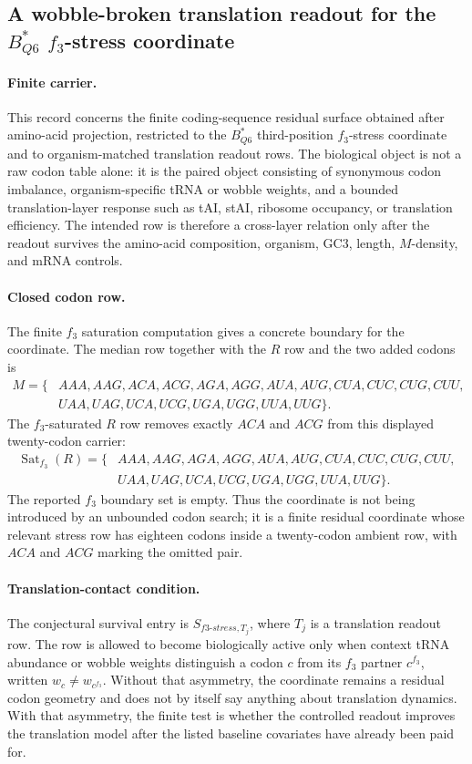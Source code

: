 \subsection{A wobble-broken translation readout for the $B^{*}_{Q6}$ $f_3$-stress coordinate}
\label{sec:q6-f3-stress-wobble-broken-translation-readout-cross-layer}

\paragraph{Finite carrier.}
This record concerns the finite coding-sequence residual surface obtained after amino-acid projection, restricted to the $B^{*}_{Q6}$ third-position $f_3$-stress coordinate and to organism-matched translation readout rows.  The biological object is not a raw codon table alone: it is the paired object consisting of synonymous codon imbalance, organism-specific tRNA or wobble weights, and a bounded translation-layer response such as tAI, stAI, ribosome occupancy, or translation efficiency.  The intended row is therefore a cross-layer relation only after the readout survives the amino-acid composition, organism, GC3, length, $M$-density, and mRNA controls.

\paragraph{Closed codon row.}
The finite $f_3$ saturation computation gives a concrete boundary for the coordinate.  The median row together with the $R$ row and the two added codons is
$$
\begin{aligned}
M = \{&AAA,AAG,ACA,ACG,AGA,AGG,AUA,AUG,CUA,CUC,CUG,CUU,\\
     &UAA,UAG,UCA,UCG,UGA,UGG,UUA,UUG\}.
\end{aligned}
$$
The $f_3$-saturated $R$ row removes exactly $ACA$ and $ACG$ from this displayed twenty-codon carrier:
$$
\begin{aligned}
\operatorname{Sat}_{f_3}(R)=\{&AAA,AAG,AGA,AGG,AUA,AUG,CUA,CUC,CUG,CUU,\\
&UAA,UAG,UCA,UCG,UGA,UGG,UUA,UUG\}.
\end{aligned}
$$
The reported $f_3$ boundary set is empty.  Thus the coordinate is not being introduced by an unbounded codon search; it is a finite residual coordinate whose relevant stress row has eighteen codons inside a twenty-codon ambient row, with $ACA$ and $ACG$ marking the omitted pair.

\paragraph{Translation-contact condition.}
The conjectural survival entry is $S_{f3\text{-}stress,T_j}$, where $T_j$ is a translation readout row.  The row is allowed to become biologically active only when context tRNA abundance or wobble weights distinguish a codon $c$ from its $f_3$ partner $c^{f_3}$, written $w_c \ne w_{c^{f_3}}$.  Without that asymmetry, the coordinate remains a residual codon geometry and does not by itself say anything about translation dynamics.  With that asymmetry, the finite test is whether the controlled readout improves the translation model after the listed baseline covariates have already been paid for.

